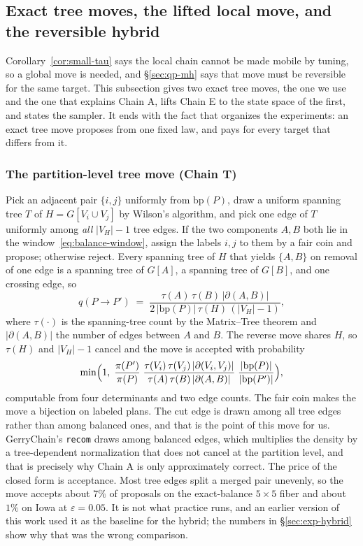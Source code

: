 \documentclass[11pt]{article}
\begin{document}
\subsection{Exact tree moves, the lifted local move, and the reversible hybrid}\label{sec:hybrid}

Corollary~\ref{cor:small-tau} says the local chain cannot be made
mobile by tuning, so a global move is needed, and \S\ref{sec:qp-mh}
says that move must be reversible for the same target. This
subsection gives two exact tree moves, the one we use and the one
that explains Chain A, lifts Chain E to the state space of the first,
and states the sampler. It ends with the fact that organizes the
experiments: an exact tree move proposes from one fixed law, and pays
for every target that differs from it.

\subsubsection{The partition-level tree move (Chain T)}\label{sec:tree-partition}

Pick an adjacent pair $\{i,j\}$ uniformly from $\mathrm{bp}(P)$, draw
a uniform spanning tree $T$ of $H = G[V_i \cup V_j]$ by Wilson's
algorithm, and pick one edge of $T$ uniformly among \emph{all}
$|V_H| - 1$ tree edges. If the two components $A, B$ both lie in the
window~\eqref{eq:balance-window}, assign the labels $i, j$ to them by
a fair coin and propose; otherwise reject. Every spanning tree of $H$
that yields $\{A, B\}$ on removal of one edge is a spanning tree of
$G[A]$, a spanning tree of $G[B]$, and one crossing edge, so
\[
  q(P \to P') \;=\;
  \frac{\tau(A)\,\tau(B)\,|\partial(A,B)|}
       {2\,|\mathrm{bp}(P)|\,\tau(H)\,(|V_H| - 1)},
\]
where $\tau(\cdot)$ is the spanning-tree count by the Matrix--Tree
theorem and $|\partial(A,B)|$ the number of edges between $A$ and $B$.
The reverse move shares $H$, so $\tau(H)$ and $|V_H| - 1$ cancel and
the move is accepted with probability
\[
  \min\Bigl(1,\;
  \frac{\pi(P')}{\pi(P)}\;
  \frac{\tau(V_i)\,\tau(V_j)\,|\partial(V_i,V_j)|}
       {\tau(A)\,\tau(B)\,|\partial(A,B)|}\;
  \frac{|\mathrm{bp}(P)|}{|\mathrm{bp}(P')|}\Bigr),
\]
computable from four determinants and two edge counts. The fair coin
makes the move a bijection on labeled plans. The cut edge is drawn
among all tree edges rather than among balanced ones, and that is the
point of this move for us. GerryChain's \texttt{recom} draws among
balanced edges, which multiplies the density by a tree-dependent
normalization that does not cancel at the partition level, and that
is precisely why Chain A is only approximately correct. The price of
the closed form is acceptance. Most tree edges split a merged pair
unevenly, so the move accepts about $7\%$ of proposals on the
exact-balance $5 \times 5$ fiber and about $1\%$ on Iowa at
$\varepsilon = 0.05$. It is not what practice runs, and an earlier
version of this work used it as the baseline for the hybrid; the
numbers in \S\ref{sec:exp-hybrid} show why that was the wrong
comparison.
\end{document}
